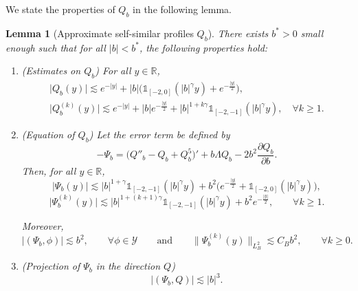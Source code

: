 \documentclass[16pt,english, oneside,reqno]{smfart}
\newcommand{\RR}{\mathbb{R}}
\newtheorem{lemma}[theorem]{Lemma}
\begin{document}
We state the properties of $Q_b$ in the following lemma.
\begin{lemma}[Approximate self-similar profiles $Q_b$]
    There exists $b^*>0$ small enough such that for all $|b|<b^*$, the following properties hold:
    \begin{enumerate}
        \item (Estimates on $Q_b$) For all $y\in \RR$,
        \begin{equation}\label{estimate_on_Q_b_and_its_derivs}
        \begin{split}
            \lvert Q_b(y)\rvert \lesssim e^{-|y|}+|b|\Big( \mathds{1}_{[-2,0]}(|b|^{\gamma}y)+e^{-\frac{|y|}{2}}\Big),\\
            \lvert Q^{(k)}_b(y)\rvert \lesssim e^{-|y|}+|b|e^{-\frac{|y|}{2}} + |b|^{1+k\gamma}\mathds{1}_{[-2,-1]}(|b|^{\gamma}y), \quad \forall k \geq 1.
        \end{split}
        \end{equation}

        \item (Equation of $Q_b$) Let the error term be defined by
        \begin{equation}
            -\Psi_b = \big( Q''_b-Q_b+Q^5_b \big)' + b\Lambda Q_b - 2 b^2 \frac{\partial Q_b}{\partial b}.
        \end{equation}
        Then, for all $y\in \RR$,
        \begin{equation}
            \lvert \Psi_b(y) \rvert \lesssim |b|^{1+\gamma} \mathds{1}_{[-2,-1]}(|b|^{\gamma}y)+b^2 \Big( e^{-\frac{|y|}{2}} + \mathds{1}_{[-2,0]}(|b|^{\gamma} y) \Big),
        \end{equation}
        \begin{equation}
            \lvert \Psi^{(k)}_b(y) \rvert \lesssim |b|^{1+(k+1)\gamma}\mathds{1}_{[-2,-1]}(|b|^{\gamma}y) + b^2 e^{-\frac{|y|}{2}}, \qquad \forall k \geq 1.
        \end{equation}

        Moreover,
        \begin{equation}
            \lvert (\Psi_b,\phi)\rvert \lesssim b^2, \qquad \forall \phi \in \mathcal{Y} \qquad\text{and}\qquad \| \Psi^{(k)}_b (y) \|_{L^2_B} \lesssim C_B b^2, \qquad \forall k \geq 0.
        \end{equation}

        \item (Projection of $\Psi_b$ in the direction $Q$)
        \begin{equation}
            \lvert (\Psi_b, Q) \rvert \lesssim |b|^3.
        \end{equation}


\end{enumerate}
\end{lemma}
\end{document}
